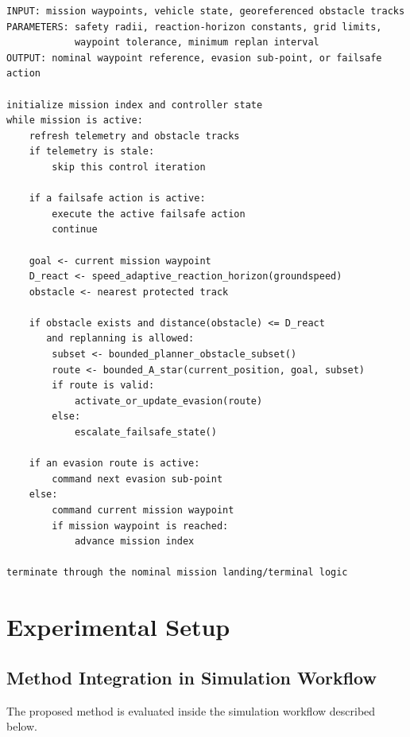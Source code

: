 \documentclass[electronics,article,submit,moreauthors]{Definitions/mdpi}
\DeclareRobustCommand{\deleted}[1]{}%
\DeclareRobustCommand{\added}[1]{#1}%
\def\PORCEcodeformat{\ttfamily\footnotesize\color{black}}%
\def\PORCEkwformat{\color{black}}%
\def\PORCEcommentformat{\color{black}}%
\def\PORCEstringformat{\color{black}}%
\DeclareRobustCommand{\deleted}[1]{\textcolor{black}{\sout{#1}}}
\DeclareRobustCommand{\added}[1]{\textcolor{green!50!black}{#1}}
\def\PORCEcodeformat{\ttfamily\footnotesize\color{green!50!black}}%
\def\PORCEkwformat{\color{green!50!black}}%
\def\PORCEcommentformat{\color{green!50!black}}%
\def\PORCEstringformat{\color{green!50!black}}%
\def\deleted#1{}%
\def\added#1{#1}%
\begin{document}
\begin{lstlisting}[caption=\added{Implementation-independent pseudocode of the PORCE control loop}, label=lst:control, basicstyle=\PORCEcodeformat, keywordstyle=\PORCEkwformat, commentstyle=\PORCEcommentformat, stringstyle=\PORCEstringformat]
INPUT: mission waypoints, vehicle state, georeferenced obstacle tracks
PARAMETERS: safety radii, reaction-horizon constants, grid limits,
            waypoint tolerance, minimum replan interval
OUTPUT: nominal waypoint reference, evasion sub-point, or failsafe action

initialize mission index and controller state
while mission is active:
    refresh telemetry and obstacle tracks
    if telemetry is stale:
        skip this control iteration

    if a failsafe action is active:
        execute the active failsafe action
        continue

    goal <- current mission waypoint
    D_react <- speed_adaptive_reaction_horizon(groundspeed)
    obstacle <- nearest protected track

    if obstacle exists and distance(obstacle) <= D_react
       and replanning is allowed:
        subset <- bounded_planner_obstacle_subset()
        route <- bounded_A_star(current_position, goal, subset)
        if route is valid:
            activate_or_update_evasion(route)
        else:
            escalate_failsafe_state()

    if an evasion route is active:
        command next evasion sub-point
    else:
        command current mission waypoint
        if mission waypoint is reached:
            advance mission index

terminate through the nominal mission landing/terminal logic
\end{lstlisting}



\section{Experimental Setup}
\subsection{Method Integration in Simulation Workflow}
\label{sec:Sim_workflow}
The proposed method is evaluated inside \deleted{a validated \texttt{SIMULATION}}\added{the simulation} workflow\deleted{.}\added{ described below.}
\end{document}
